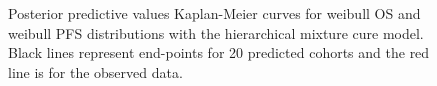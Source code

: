 \documentclass[AMA,STIX1COL]{WileyNJD-v2}
\begin{document}
\begin{figure}[H]
    \centering
    \qquad
    \caption{Posterior predictive values Kaplan-Meier curves for weibull OS and weibull PFS distributions with the hierarchical mixture cure model. Black lines represent end-points for 20 predicted cohorts and the red line is for the observed data.}%


\end{figure}
\end{document}
